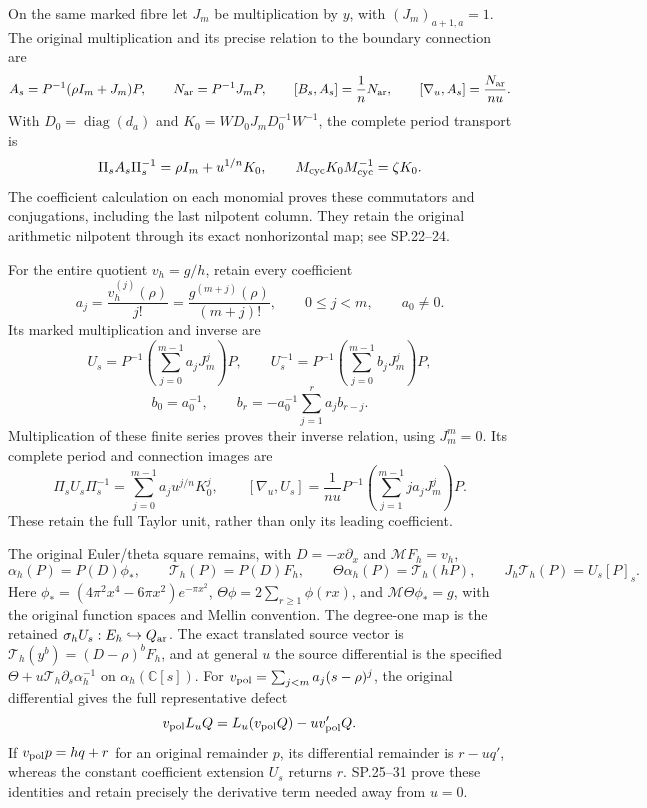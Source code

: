\documentclass[11pt]{article}
\begin{document}
On the same marked fibre let \(J_m\) be multiplication by \(y\), with
\((J_m)_{a+1,a}=1\).  The original multiplication and its precise
relation to the boundary connection are
\[
 A_s=P^{-1}(\rho I_m+J_m)P,\qquad
 N_{\rm ar}=P^{-1}J_mP,\qquad
 [B_s,A_s]=\frac1nN_{\rm ar},\qquad
 [\nabla_u,A_s]=\frac{N_{\rm ar}}{nu}.
\]
With \(D_0=\operatorname{diag}(d_a)\) and
\(K_0=WD_0J_mD_0^{-1}W^{-1}\), the complete period transport is
\[
 \Pi_sA_s\Pi_s^{-1}=\rho I_m+u^{1/n}K_0,\qquad
 M_{\rm cyc}K_0M_{\rm cyc}^{-1}=\zeta K_0 .
\]
The coefficient calculation on each monomial proves these
commutators and conjugations, including the last nilpotent column.
They retain the original arithmetic nilpotent through its exact
nonhorizontal map; see SP.22--24.

For the entire quotient \(v_h=g/h\), retain every coefficient
\[
 a_j=\frac{v_h^{(j)}(\rho)}{j!}
     =\frac{g^{(m+j)}(\rho)}{(m+j)!},\qquad 0\leq j<m,
 \qquad a_0\ne0 .
\]
Its marked multiplication and inverse are
\[
 U_s=P^{-1}\left(\sum_{j=0}^{m-1}a_jJ_m^j\right)P,\qquad
 U_s^{-1}=P^{-1}\left(\sum_{j=0}^{m-1}b_jJ_m^j\right)P,
\]
\[
 b_0=a_0^{-1},\qquad
 b_r=-a_0^{-1}\sum_{j=1}^r a_jb_{r-j}.
\]
Multiplication of these finite series proves their inverse relation,
using \(J_m^m=0\).  Its complete period and connection images are
\[
 \Pi_sU_s\Pi_s^{-1}
    =\sum_{j=0}^{m-1}a_j u^{j/n}K_0^j,\qquad
 [\nabla_u,U_s]
    =\frac1{nu}P^{-1}
          \left(\sum_{j=1}^{m-1}j a_jJ_m^j\right)P.
\]
These retain the full Taylor unit, rather than only its leading
coefficient.

The original Euler/theta square remains, with
\(D=-x\partial_x\) and \(\mathcal MF_h=v_h\),
\[
 \alpha_h(P)=P(D)\phi_*,\qquad
 \mathcal T_h(P)=P(D)F_h,\qquad
 \Theta\alpha_h(P)=\mathcal T_h(hP),\qquad
 J_h\mathcal T_h(P)=U_s[P]_s.
\]
Here
\(\phi_*=(4\pi^2x^4-6\pi x^2)e^{-\pi x^2}\),
\(\Theta\phi=2\sum_{r\geq1}\phi(rx)\), and
\(\mathcal M\Theta\phi_*=g\), with the original function spaces and
Mellin convention.  The degree-one map is the retained
\(\sigma_hU_s:E_h\hookrightarrow Q_{\rm ar}\).
The exact translated source vector is
\(\mathcal T_h(y^b)=(D-\rho)^bF_h\), and at general \(u\) the
source differential is the specified
\(\Theta+u\mathcal T_h\partial_s\alpha_h^{-1}\) on
\(\alpha_h(\mathbb C[s])\).
For \(v_{\rm pol}=\sum_{j<m}a_j(s-\rho)^j\), the original differential
gives the full representative defect
\[
 v_{\rm pol}L_uQ=L_u(v_{\rm pol}Q)-u v_{\rm pol}'Q.
\]
If \(v_{\rm pol}p=hq+r\) for an original remainder \(p\), its
differential remainder is \(r-uq'\), whereas the constant
coefficient extension \(U_s\) returns \(r\).
SP.25--31 prove these identities and retain precisely the derivative
term needed away from \(u=0\).
\end{document}
